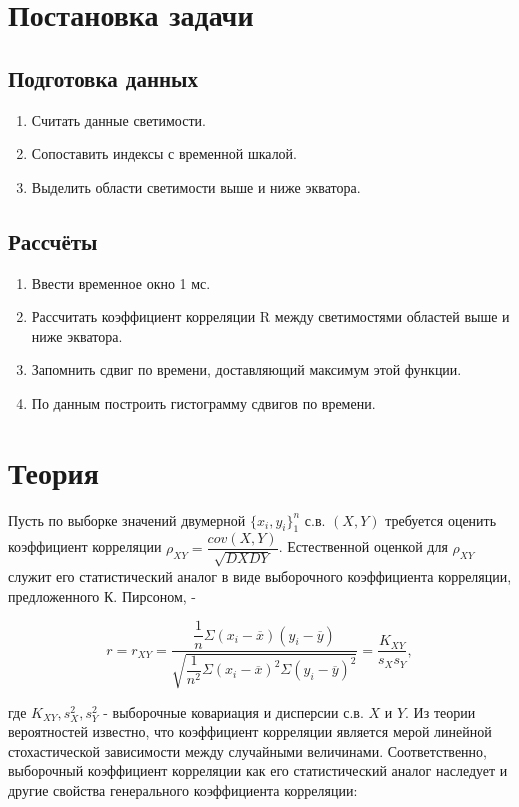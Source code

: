 \documentclass[12pt]{article}
\begin{document}
\section{Постановка задачи}

\subsection{Подготовка данных}
\begin{enumerate}
\item Считать данные светимости.
\item Сопоставить индексы с временной шкалой.
\item Выделить области светимости выше и ниже экватора.
\end{enumerate}

\subsection{Рассчёты}
\begin{enumerate}
\item Ввести временное окно 1 мс.
\item Рассчитать коэффициент корреляции R между светимостями областей выше и ниже экватора.
\item Запомнить сдвиг по времени, доставляющий максимум этой функции.
\item По данным построить гистограмму сдвигов по времени.
\end{enumerate}

\section{Теория}
Пусть по выборке значений двумерной $ \{x_{i}, y_{i}\}^{n}_{1} $ с.в. $ (X, Y) $ требуется оценить коэффициент корреляции $ \rho_{XY} = \dfrac{cov(X, Y)}{\sqrt{DX DY}}  $. Естественной оценкой для $ \rho_{XY} $ служит его статистический аналог в виде выборочного коэффициента корреляции, предложенного К. Пирсоном, -

\begin{equation}
r = r_{XY} = \dfrac{\dfrac{1}{n}\Sigma{(x_{i} - \overline{x})(y_{i} - \overline{y})}}{\sqrt{\dfrac{1}{n^{2}} \Sigma(x_{i} - \overline{x})^{2} \Sigma(y_{i} - \overline{y})^{2}}} = \dfrac{K_{XY}}{s_{X}s_{Y}},  \label{eqn:corr}
\end{equation}

где $K_{XY}, s_{X}^{2}, s_{Y}^{2}$ - выборочные ковариация и дисперсии с.в. $X$ и $Y$.
Из теории вероятностей известно, что коэффициент корреляции является мерой линейной стохастической зависимости между случайными величинами. Соответственно, выборочный коэффициент корреляции как его статистический аналог наследует и другие свойства генерального коэффициента корреляции:
\end{document}
